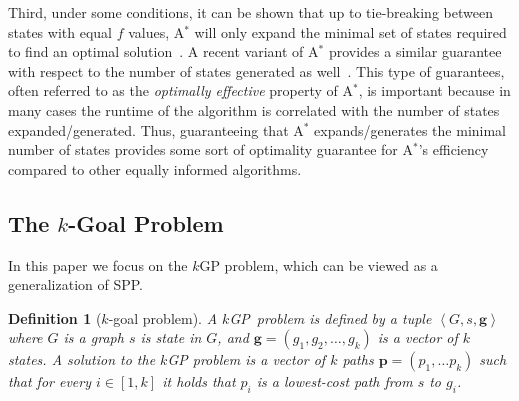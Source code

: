 \documentclass{aicom2e}
\newtheorem{definition}{Definition}
\newcommand{\kgs}{$k$GP}
\newcommand{\astar}{A$^*$}
\newcommand{\tuple}[1]{\ensuremath{\left \langle #1 \right \rangle }}
\newcommand{\roni}[1]{\textbf{[RS:#1]}}
\begin{document}

Third, under some conditions, it can be shown that up to tie-breaking between
states with equal $f$ values, \astar{} will only expand the minimal set of
states required to find an optimal
solution~\cite{dechter1985generalizedBestFirst}. A recent variant of \astar{}
provides a similar guarantee with respect to the number of states generated as
well~\cite{goldenberg2013optimal}. This type of guarantees, often referred to
as the {\em optimally effective} property of \astar{}, is  important because in
many cases the runtime of the algorithm is correlated with the number of states
expanded/generated. Thus, guaranteeing that \astar{} expands/generates the
minimal number of states provides some sort of optimality guarantee for
\astar{}'s efficiency compared to other equally informed algorithms.


\subsection{The $k$-Goal Problem}

In this paper we focus on the \kgs{} problem, which can be viewed as a generalization of SPP.



\begin{definition}[$k$-goal problem]
A \kgs\ problem is defined by a tuple $\tuple{G,s, \textbf{g}}$ where $G$ is a
graph $s$ is state in $G$, and $\textbf{g}=(g_1,g_2,\ldots,g_k)$ is a vector of
$k$ states. A solution to the \kgs{} problem is a vector of $k$ paths
$\textbf{p}=(p_1,\ldots p_k)$ such that for every  $i\in [1,k]$ it holds that
$p_i$ is a lowest-cost path from $s$ to $g_i$. \label{def:k-goal}
\end{definition}
\end{document}
